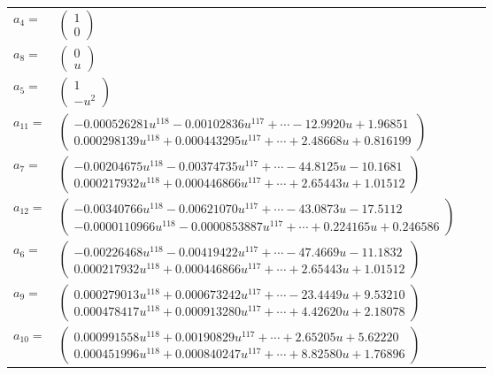 \documentclass[1p]{elsarticle_modified}
\theoremstyle{definition}
\begin{document}
\begin{tabular}{m{7pt} m{180pt} m{7pt} m{180pt} }
\flushright $a_{4}=$&$\begin{pmatrix}1\\0\end{pmatrix}$ \\
\flushright $a_{8}=$&$\begin{pmatrix}0\\u\end{pmatrix}$ \\
\flushright $a_{5}=$&$\begin{pmatrix}1\\- u^2\end{pmatrix}$ \\
\flushright $a_{11}=$&$\begin{pmatrix}-0.000526281 u^{118}-0.00102836 u^{117}+\cdots-12.9920 u+1.96851\\0.000298139 u^{118}+0.000443295 u^{117}+\cdots+2.48668 u+0.816199\end{pmatrix}$ \\
\flushright $a_{7}=$&$\begin{pmatrix}-0.00204675 u^{118}-0.00374735 u^{117}+\cdots-44.8125 u-10.1681\\0.000217932 u^{118}+0.000446866 u^{117}+\cdots+2.65443 u+1.01512\end{pmatrix}$ \\
\flushright $a_{12}=$&$\begin{pmatrix}-0.00340766 u^{118}-0.00621070 u^{117}+\cdots-43.0873 u-17.5112\\-0.0000110966 u^{118}-0.0000853887 u^{117}+\cdots+0.224165 u+0.246586\end{pmatrix}$ \\
\flushright $a_{6}=$&$\begin{pmatrix}-0.00226468 u^{118}-0.00419422 u^{117}+\cdots-47.4669 u-11.1832\\0.000217932 u^{118}+0.000446866 u^{117}+\cdots+2.65443 u+1.01512\end{pmatrix}$ \\
\flushright $a_{9}=$&$\begin{pmatrix}0.000279013 u^{118}+0.000673242 u^{117}+\cdots-23.4449 u+9.53210\\0.000478417 u^{118}+0.000913280 u^{117}+\cdots+4.42620 u+2.18078\end{pmatrix}$ \\
\flushright $a_{10}=$&$\begin{pmatrix}0.000991558 u^{118}+0.00190829 u^{117}+\cdots+2.65205 u+5.62220\\0.000451996 u^{118}+0.000840247 u^{117}+\cdots+8.82580 u+1.76896\end{pmatrix}$ \\

\end{tabular}
\end{document}
